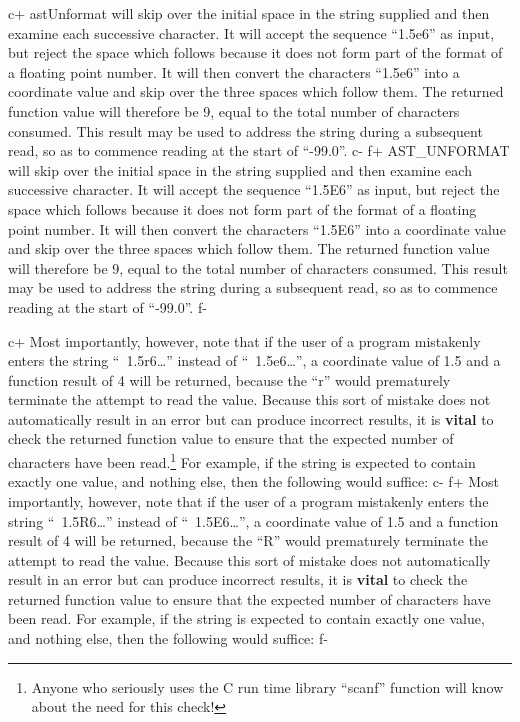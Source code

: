 \documentclass[twoside,11pt]{article}
\begin{document}
c+
astUnformat will skip over the initial space in the string supplied
and then examine each successive character. It will accept the
sequence ``1.5e6'' as input, but reject the space which follows
because it does not form part of the format of a floating point
number. It will then convert the characters ``1.5e6'' into a
coordinate value and skip over the three spaces which follow them. The
returned function value will therefore be 9, equal to the total number
of characters consumed. This result may be used to address the string
during a subsequent read, so as to commence reading at the start of
``-99.0''.
c-
f+
AST\_UNFORMAT will skip over the initial space in the string supplied
and then examine each successive character. It will accept the
sequence ``1.5E6'' as input, but reject the space which follows
because it does not form part of the format of a floating point
number. It will then convert the characters ``1.5E6'' into a
coordinate value and skip over the three spaces which follow them. The
returned function value will therefore be 9, equal to the total number
of characters consumed. This result may be used to address the string
during a subsequent read, so as to commence reading at the start of
``-99.0''.
f-

c+
Most importantly, however, note that if the user of a program
mistakenly enters the string ``~1.5r6\ldots'' instead of
``~1.5e6\ldots'', a coordinate value of 1.5 and a function result of 4
will be returned, because the ``r'' would prematurely terminate the
attempt to read the value. Because this sort of mistake does not
automatically result in an error but can produce incorrect results, it
is {\bf{vital}} to check the returned function value to ensure that
the expected number of characters have been read.\footnote{Anyone who
seriously uses the C run time library ``scanf'' function will know
about the need for this check!}  For example, if the string is
expected to contain exactly one value, and nothing else, then the
following would suffice:
c-
f+
Most importantly, however, note that if the user of a program
mistakenly enters the string ``~1.5R6\ldots'' instead of
``~1.5E6\ldots'', a coordinate value of 1.5 and a function result of 4
will be returned, because the ``R'' would prematurely terminate the
attempt to read the value. Because this sort of mistake does not
automatically result in an error but can produce incorrect results, it
is {\bf{vital}} to check the returned function value to ensure that
the expected number of characters have been read. For example, if the
string is expected to contain exactly one value, and nothing else,
then the following would suffice:
f-
\end{document}
